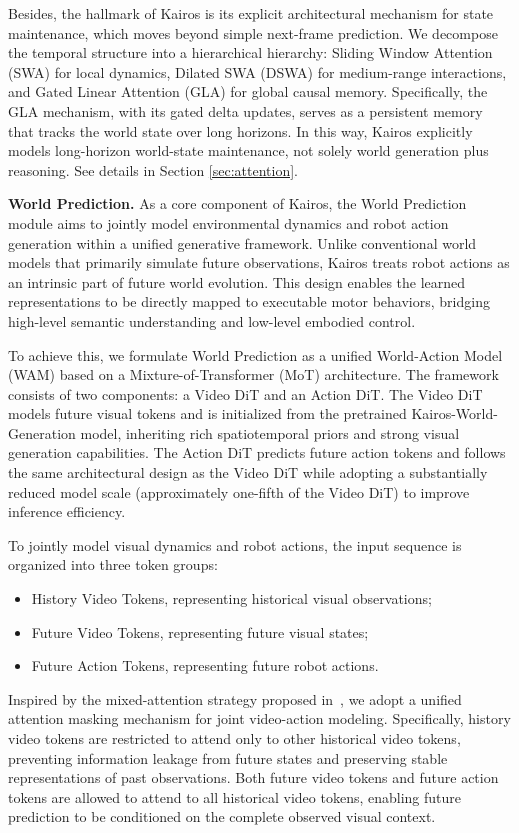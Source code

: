 Besides, the hallmark of Kairos is its explicit architectural mechanism for state maintenance, which moves beyond simple next-frame prediction. We decompose the temporal structure into a hierarchical hierarchy: Sliding Window Attention (SWA) for local dynamics, Dilated SWA (DSWA) for medium-range interactions, and Gated Linear Attention (GLA) for global causal memory. Specifically, the GLA mechanism, with its gated delta updates, serves as a persistent memory that tracks the world state over long horizons. In this way, Kairos explicitly models long-horizon world-state maintenance, not solely world generation plus reasoning. See details in Section \ref{sec:attention}.


\textbf{World Prediction.}
As a core component of Kairos, the World Prediction module aims to jointly model environmental dynamics and robot action generation within a unified generative framework. Unlike conventional world models that primarily simulate future observations, Kairos treats robot actions as an intrinsic part of future world evolution. This design enables the learned representations to be directly mapped to executable motor behaviors, bridging high-level semantic understanding and low-level embodied control.

To achieve this, we formulate World Prediction as a unified World-Action Model (WAM) based on a Mixture-of-Transformer (MoT) architecture. The framework consists of two components: a Video DiT and an Action DiT. The Video DiT models future visual tokens and is initialized from the pretrained Kairos-World-Generation model, inheriting rich spatiotemporal priors and strong visual generation capabilities. The Action DiT predicts future action tokens and follows the same architectural design as the Video DiT while adopting a substantially reduced model scale (approximately one-fifth of the Video DiT) to improve inference efficiency.

To jointly model visual dynamics and robot actions, the input sequence is organized into three token groups:
\begin{itemize}
\item History Video Tokens, representing historical visual observations;
\item Future Video Tokens, representing future visual states;
\item Future Action Tokens, representing future robot actions.
\end{itemize}

Inspired by the mixed-attention strategy proposed in~\cite{yuan2026fastwam}, we adopt a unified attention masking mechanism for joint video-action modeling. Specifically, history video tokens are restricted to attend only to other historical video tokens, preventing information leakage from future states and preserving stable representations of past observations. Both future video tokens and future action tokens are allowed to attend to all historical video tokens, enabling future prediction to be conditioned on the complete observed visual context.

